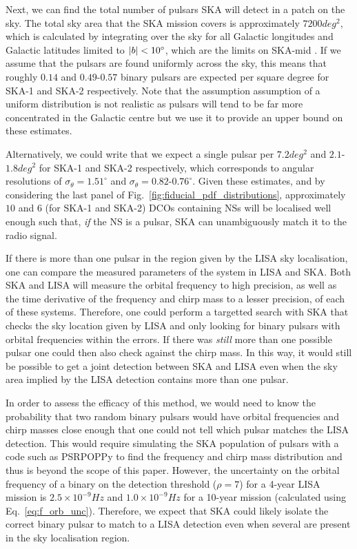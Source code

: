 Next, we can find the total number of pulsars SKA will detect in a patch on the sky. The total sky area that the SKA mission covers is approximately $7200 \unit{deg^2}$, which is calculated by integrating over the sky for all Galactic longitudes and Galactic latitudes limited to $\abs{b} < 10^\circ$, which are the limits on SKA-mid \citep{Keane+2015}. If we assume that the pulsars are found uniformly across the sky, this means that roughly $0.14$ and $0.49$-$0.57$ binary pulsars are expected per square degree for SKA-1 and SKA-2 respectively. Note that the assumption assumption of a uniform distribution is not realistic as pulsars will tend to be far more concentrated in the Galactic centre but we use it to provide an upper bound on these estimates.

Alternatively, we could write that we expect a single pulsar per $7.2 \unit{deg^2}$ and $2.1$-$1.8 \unit{deg^2}$ for SKA-1 and SKA-2 respectively, which corresponds to angular resolutions of $\sigma_\theta = 1.51^\circ$ and $\sigma_\theta = 0.82$-$0.76^\circ$. Given these estimates, and by considering the last panel of Fig.~\ref{fig:fiducial_pdf_distributions}, approximately $10$ and $6$ (for SKA-1 and SKA-2) DCOs containing NSs will be localised well enough such that, \textit{if} the NS is a pulsar, SKA can unambiguously match it to the radio signal.

If there is more than one pulsar in the region given by the LISA sky localisation, one can compare the measured parameters of the system in LISA and SKA. Both SKA and LISA will measure the orbital frequency to high precision, as well as the time derivative of the frequency and chirp mass to a lesser precision, of each of these systems. Therefore, one could perform a targetted search with SKA that checks the sky location given by LISA and only looking for binary pulsars with orbital frequencies within the errors. If there was \textit{still} more than one possible pulsar one could then also check against the chirp mass. In this way, it would still be possible to get a joint detection between SKA and LISA even when the sky area implied by the LISA detection contains more than one pulsar.

In order to assess the efficacy of this method, we would need to know the probability that two random binary pulsars would have orbital frequencies and chirp masses close enough that one could not tell which pulsar matches the LISA detection. This would require simulating the SKA population of pulsars with a code such as PSRPOPPy to find the frequency and chirp mass distribution and thus is beyond the scope of this paper. However, the uncertainty on the orbital frequency of a binary on the detection threshold ($\rho = 7$) for a 4-year LISA mission is $2.5 \times 10^{-9} \unit{Hz}$ and $1.0 \times 10^{-9} \unit{Hz}$ for a 10-year mission (calculated using Eq.~\ref{eq:f_orb_unc}). Therefore, we expect that SKA could likely isolate the correct binary pulsar to match to a LISA detection even when several are present in the sky localisation region.

